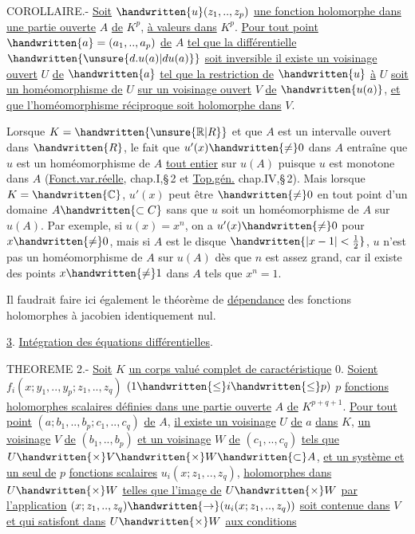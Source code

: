 COROLLAIRE.- \uline{Soit} $\handwritten{u}(z_1,..,z_p)$ \uline{une fonction holomorphe dans une partie ouverte} $A$ \uline{de} $K^p$, \uline{à valeurs dans} $K^p$. \uline{Pour tout point} $\handwritten{a}=(a_1,..,a_p)$ \uline{de} $A$ \uline{tel que la différentielle} $\handwritten{\unsure{d.u(a)|du(a)}}$ \uline{soit inversible il existe un voisinage ouvert} $U$ \uline{de} $\handwritten{a}$ \uline{tel que la restriction de} $\handwritten{u}$ \uline{à} $U$ \uline{soit un homéomorphisme de} $U$ \uline{sur un voisinage ouvert} $V$ \uline{de} $\handwritten{u(a)}$, \uline{et que l'homéomorphisme réciproque soit holomorphe dans} $V$.

Lorsque $K=\handwritten{\unsure{\mathbb{R}|R}}$ et que $A$ est un intervalle ouvert dans $\handwritten{R}$, le fait que $u'(x)\handwritten{\ne}0$ dans $A$ entraîne que $u$ est un homéomorphisme de $A$ \uline{tout entier} sur $u(A)$ puisque $u$ est monotone dans $A$ (\uline{Fonct.var.réelle}, chap.I,\S\,2 et \uline{Top.gén.} chap.IV,\S\,2). Mais lorsque $K=\handwritten{\mathbb{C}}$, $u'(x)$ peut être $\handwritten{\ne}0$ en tout point d'un domaine $A\handwritten{\subset C}$ sans que $u$ soit un homéomorphisme de $A$ sur $u(A)$. Par exemple, si $u(x)=x^n$, on a $u'(x)\handwritten{\ne}0$ pour $x\handwritten{\ne}0$, mais si $A$ est le disque $\handwritten{|x-1|<\frac{1}{2}}$, $u$ n'est pas un homéomorphisme de $A$ sur $u(A)$ dès que $n$ est assez grand, car il existe des points $x\handwritten{\ne}1$ dans $A$ tels que $x^n=1$.

Il faudrait faire ici également le théorème de \uline{dépendance} des fonctions holomorphes à jacobien identiquement nul.

\uline{3}. \uline{Intégration des équations différentielles}.

THEOREME 2.- \uline{Soit} $K$ \uline{un corps valué complet de caractéristique} $0$. \uline{Soient} \margin{\handwritten{\unsure{-}}}$f_i(x;y_1,..,y_p;z_1,..,z_q)$ $(1\handwritten{\leq}i\handwritten{\leq}p)$ $p$ \uline{fonctions holomorphes scalaires définies dans une partie ouverte} $A$ \uline{de} $K^{p+q+1}$. \uline{Pour tout point} $(a;b_1,..,b_p;c_1,..,c_q)$ \uline{de} $A$, \uline{il existe un voisinage} $U$ \uline{de} $a$ \uline{dans} $K$, \uline{un voisinage} $V$ \uline{de} $(b_1,..,b_p)$ \uline{et un voisinage} $W$ \uline{de} $(c_1,..,c_q)$ \uline{tels que} $U\handwritten{\times}V\handwritten{\times}W\handwritten{\subset}A$, \uline{et un système et un seul de} $p$ \uline{fonctions scalaires} $u_i(x;z_1,..,z_q)$, \uline{holomorphes dans} $U\handwritten{\times}W$ \uline{telles que l'image de} $U\handwritten{\times}W$ \uline{par l'application} $(x;z_1,..,z_q)\handwritten{\to}(u_i(x;z_1,..,z_q))$ \uline{soit contenue dans} $V$ \uline{et qui satisfont dans} $U\handwritten{\times}W$ \uline{aux conditions}
